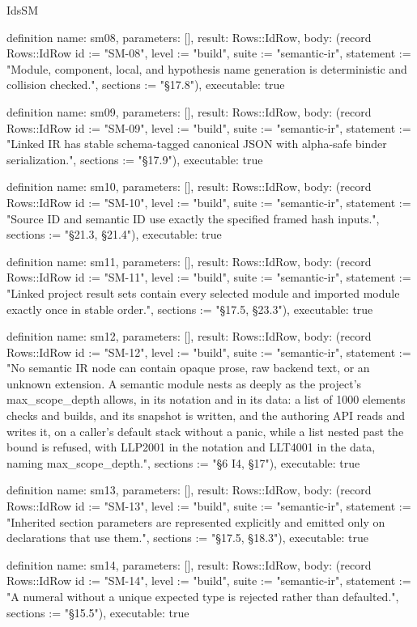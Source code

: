 \begin{lexlean}{IdsSM}
\begin{semanticmodule}
definition{
  name: sm08,
  parameters: [],
  result: Rows::IdRow,
  body: (record Rows::IdRow {id := "SM-08", level := "build", suite := "semantic-ir", statement := "Module, component, local, and hypothesis name generation is deterministic and collision checked.", sections := "§17.8"}),
  executable: true
}

definition{
  name: sm09,
  parameters: [],
  result: Rows::IdRow,
  body: (record Rows::IdRow {id := "SM-09", level := "build", suite := "semantic-ir", statement := "Linked IR has stable schema-tagged canonical JSON with alpha-safe binder serialization.", sections := "§17.9"}),
  executable: true
}

definition{
  name: sm10,
  parameters: [],
  result: Rows::IdRow,
  body: (record Rows::IdRow {id := "SM-10", level := "build", suite := "semantic-ir", statement := "Source ID and semantic ID use exactly the specified framed hash inputs.", sections := "§21.3, §21.4"}),
  executable: true
}

definition{
  name: sm11,
  parameters: [],
  result: Rows::IdRow,
  body: (record Rows::IdRow {id := "SM-11", level := "build", suite := "semantic-ir", statement := "Linked project result sets contain every selected module and imported module exactly once in stable order.", sections := "§17.5, §23.3"}),
  executable: true
}

definition{
  name: sm12,
  parameters: [],
  result: Rows::IdRow,
  body: (record Rows::IdRow {id := "SM-12", level := "build", suite := "semantic-ir", statement := "No semantic IR node can contain opaque prose, raw backend text, or an unknown extension. A semantic module nests as deeply as the project's max_scope_depth allows, in its notation and in its data: a list of 1000 elements checks and builds, and its snapshot is written, and the authoring API reads and writes it, on a caller's default stack without a panic, while a list nested past the bound is refused, with LLP2001 in the notation and LLT4001 in the data, naming max_scope_depth.", sections := "§6 I4, §17"}),
  executable: true
}

definition{
  name: sm13,
  parameters: [],
  result: Rows::IdRow,
  body: (record Rows::IdRow {id := "SM-13", level := "build", suite := "semantic-ir", statement := "Inherited section parameters are represented explicitly and emitted only on declarations that use them.", sections := "§17.5, §18.3"}),
  executable: true
}

definition{
  name: sm14,
  parameters: [],
  result: Rows::IdRow,
  body: (record Rows::IdRow {id := "SM-14", level := "build", suite := "semantic-ir", statement := "A numeral without a unique expected type is rejected rather than defaulted.", sections := "§15.5"}),
  executable: true
}


\end{semanticmodule}
\end{lexlean}
